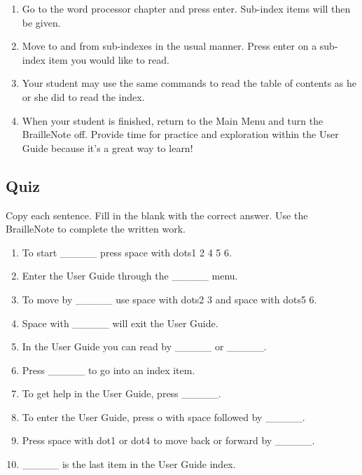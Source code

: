 \documentclass[10pt,letterpaper,twoside]{report}
\begin{document}
{{{\begin{enumerate}
	      \begin{enumerate}
		      \item Space or backspace will move forward and back by item.
		      \item Space with e will return to the table of contents.
		      \item Enter on the item you wish to read.
	      \end{enumerate}
	\item Go to the word processor chapter and press enter.  Sub-index items will then be given.
	\item Move to and from sub-indexes in the usual manner.  Press enter on a sub-index item you would like to read.
	\item Your student may use the same commands to read the table of contents as he or she did to read the index.
	\item When your student is finished, return to the Main Menu and turn the BrailleNote off.  Provide time for practice and exploration within the User Guide because it's a great way to learn!
\end{enumerate}
\clearpage

\subsection{Quiz}
Copy each sentence.  Fill in the blank with the correct answer. Use the BrailleNote to complete the written work.
\begin{enumerate}
	\item To start \_\_\_\_\_ press space with dots1 2 4 5 6.
	\item Enter the User Guide through the \_\_\_\_\_ menu.
	\item To move by \_\_\_\_\_ use space with dots2 3 and space with dots5 6.
	\item Space with \_\_\_\_\_ will exit the User Guide.
	\item In the User Guide you can read by \_\_\_\_\_ or \_\_\_\_\_.
	\item Press \_\_\_\_\_ to go into an index item.
	\item To get help in the User Guide, press \_\_\_\_\_.
	\item To enter the User Guide, press o with space followed by \_\_\_\_\_.
	\item Press space with dot1 or dot4 to move back or forward by \_\_\_\_\_.
	\item \_\_\_\_\_  is the last item in the User Guide index.
\end{enumerate}

}}}
\end{document}
